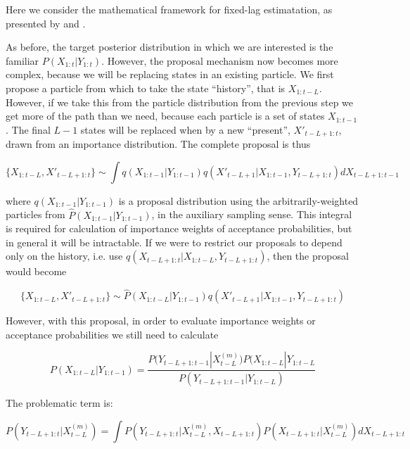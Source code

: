 Here we consider the mathematical framework for fixed-lag estimatation, as presented by \cite{Doucet2006} and \cite{Briers2006}.

As before, the target posterior distribution in which we are interested is the familiar $P(X_{1:t}|Y_{1:t})$. However, the proposal mechanism now becomes more complex, because we will be replacing states in an existing particle. We first propose a particle from which to take the state ``history'', that is $X_{1:t-L}$. However, if we take this from the particle distribution from the previous step we get more of the path than we need, because each particle is a set of states $X_{1:t-1}$. The final $L-1$ states will be replaced when by a new ``present'', $X'_{t-L+1:t}$, drawn from an importance distribution. The complete proposal is thus

\begin{equation}
\{X_{1:t-L}, X'_{t-L+1:t}\} \sim \int q(X_{1:t-1}|Y_{1:t-1}) q(X'_{t-L+1}|X_{1:t-1}, Y_{t-L+1:t}) dX_{t-L+1:t-1}
\label{eq:DumbFLProposal1}
\end{equation}

where $q(X_{1:t-1}|Y_{1:t-1})$ is a proposal distribution using the arbitrarily-weighted particles from $\hat{P}(X_{1:t-1}|Y_{1:t-1})$, in the auxiliary sampling sense. This integral is required for calculation of importance weights of acceptance probabilities, but in general it will be intractable. If we were to restrict our proposals to depend only on the history, i.e. use $q(X_{t-L+1:t}|X_{1:t-L}, Y_{t-L+1:t})$, then the proposal would become

\begin{equation}
\{X_{1:t-L}, X'_{t-L+1:t}\} \sim \hat{P}(X_{1:t-L}|Y_{1:t-1}) q(X'_{t-L+1}|X_{1:t-1}, Y_{t-L+1:t})
\label{eq:DumbFLProposal2}
\end{equation}

However, with this proposal, in order to evaluate importance weights or acceptance probabilities we still need to calculate

\begin{equation}
P(X_{1:t-L}|Y_{1:t-1}) = \frac{P(Y_{t-L+1:t-1}|X_{t-L}^{(m)}) P(X_{1:t-L}|Y_{1:t-L} }{P(Y_{t-L+1:t-1}|Y_{1:t-L})}
\label{eq:}
\end{equation}

The problematic term is:

\begin{equation}
P(Y_{t-L+1:t}|X^{(m)}_{t-L}) = \int P(Y_{t-L+1:t}|X^{(m)}_{t-L}, X_{t-L+1:t}) P(X_{t-L+1:t}|X^{(m)}_{t-L}) dX_{t-L+1:t}
\label{eq:}
\end{equation}

